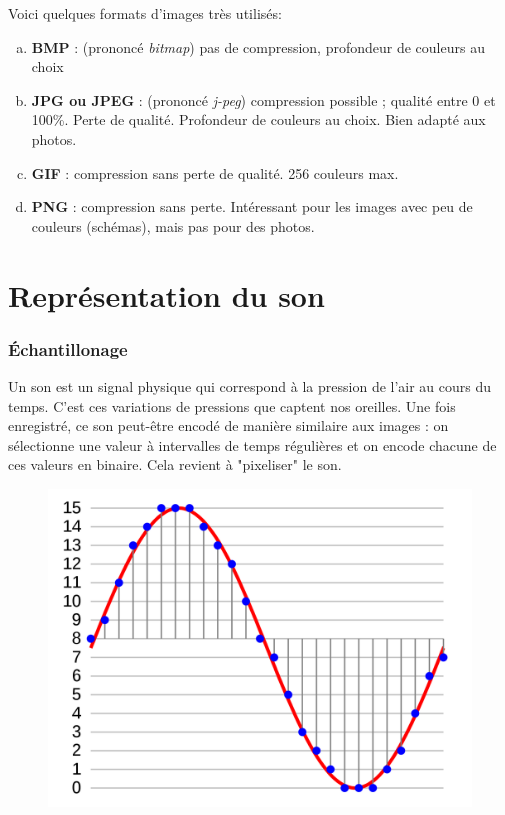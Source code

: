 \documentclass[11pt, a4paper]{book}
\begin{document}
Voici quelques formats d'images très utilisés:
\begin{enumerate}[a)]

\item {\bf BMP} : (prononcé {\it bitmap})	pas de compression, profondeur de couleurs au choix
\item {\bf JPG ou JPEG} : (prononcé {\it j-peg})	compression possible ; qualité entre 0 et 100\%. Perte de qualité. Profondeur de 
couleurs au choix. Bien adapté aux photos.
\item {\bf GIF} :	compression sans perte de qualité. 256 couleurs max.
\item {\bf PNG} :	compression sans perte. Intéressant pour les images avec peu de couleurs 
(schémas), mais pas pour des photos.

\end{enumerate}


\section{Représentation du son}
\subsubsection{Échantillonage}

Un son est un signal physique qui correspond à la pression de l'air au cours du temps. C'est ces variations de pressions que captent nos oreilles. Une fois enregistré, ce son peut-être encodé de manière similaire aux images : on sélectionne une valeur à intervalles de temps régulières et on encode chacune de ces valeurs en binaire. Cela revient à "pixeliser" le son.


\begin{center}
\begin{figure}[h!]
\includegraphics[width=12cm]{images/son}
\end{figure}
\end{center}
\end{document}
